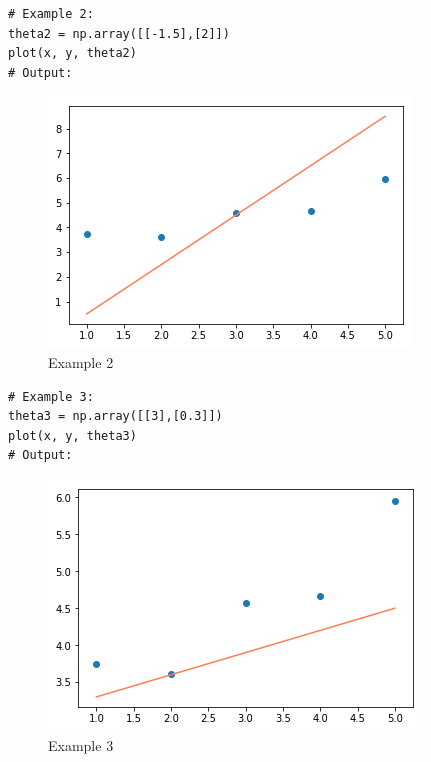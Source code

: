 \documentclass{42-en}
\begin{document}
\newpage

\begin{verbatim}
# Example 2:
theta2 = np.array([[-1.5],[2]])
plot(x, y, theta2)
# Output:
\end{verbatim}

\begin{figure}[H]
  \centering
  \includegraphics[scale=0.6]{assets/plot2.png}
  \caption{Example 2}
\end{figure}

\begin{verbatim}
# Example 3:
theta3 = np.array([[3],[0.3]])
plot(x, y, theta3)
# Output:
\end{verbatim}

\begin{figure}[H]
  \centering
  \includegraphics[scale=0.6]{assets/plot3.png}
  \caption{Example 3}
\end{figure}



\newpage
\end{document}
